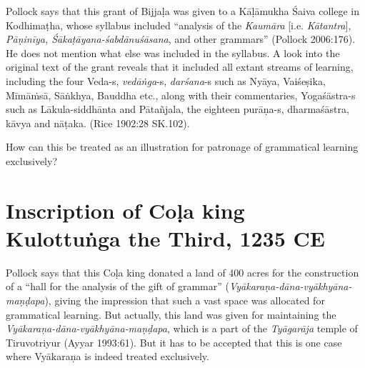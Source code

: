 Pollock says that this grant of Bijjaḷa was given to a Kāḷāmukha Śaiva college in Kodhimaṭha, whose syllabus included ``analysis of the {\sl Kaumāra} [i.e. {\sl Kātantra}], {\sl Pāṇinīya, Śākaṭāyana-śabdānuśāsana}, and other grammars'' (Pollock 2006:176). He does not mention what else was included in the syllabus. A look into the original text of the grant reveals that it included all extant streams of learning, including the four Veda-s, {\sl vedāṅga}-s, {\sl darśana}-s such as Nyāya, Vaiśeṣika, Mīmāṁsā, Sāṅkhya, Bauddha etc., along with their commentaries, \hbox{Yogaśāstra-s} such as Lākula-siddhānta and Pātañjala, the eighteen purāṇa-s, dharmaśāstra, kāvya and nāṭaka. (Rice 1902:28 SK.102).

How can this be treated as an illustration for patronage of grammatical learning exclusively?

\section{Inscription of Coḷa king Kulottuṅga the Third, 1235 CE}\label{chap3-sec18}

Pollock says that this Coḷa king donated a land of 400 acres for the construction of a ``hall for the analysis of the gift of grammar'' ({\sl Vyākaraṇa-dāna-vyākhyāna-maṇḍapa}), giving the impression that such a vast space was allocated for grammatical learning. But actually, this land was given for maintaining the {\sl Vyākaraṇa-dāna-vyākhyāna-maṇḍapa}, which is a part of the {\sl Tyāgarāja} temple of Tiruvotriyur (Ayyar 1993:61). But it has to be accepted that this is one case where Vyākaraṇa is indeed treated exclusively.

